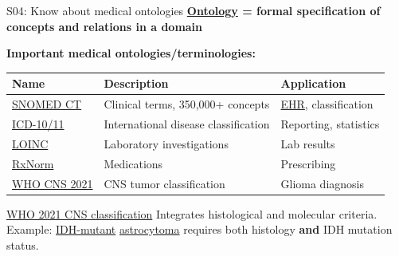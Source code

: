 \documentclass[aspectratio=169, 10pt]{beamer}
\begin{document}
\begin{frame}{S04: Know about medical ontologies}
    \textbf{\href{https://en.wikipedia.org/wiki/Ontology_(information_science)}{Ontology} = formal specification of concepts and relations in a domain}
    
    \vspace{0.3cm}
    \textbf{Important medical ontologies/terminologies:}
    \begin{center}
        \footnotesize
        \begin{tabular}{lp{5cm}l}
            \toprule
            \textbf{Name} & \textbf{Description} & \textbf{Application} \\
            \midrule
            \href{https://www.snomed.org/}{SNOMED CT} & Clinical terms, 350,000+ concepts & \href{https://en.wikipedia.org/wiki/Electronic_health_record}{EHR}, classification \\
            \href{https://www.who.int/standards/classifications/classification-of-diseases}{ICD-10/11} & International disease classification & Reporting, statistics \\
            \href{https://loinc.org/}{LOINC} & Laboratory investigations & Lab results \\
            \href{https://www.nlm.nih.gov/research/umls/rxnorm/}{RxNorm} & Medications & Prescribing \\
            \midrule
            \href{https://publications.iarc.who.int/Book-And-Report-Series/Who-Classification-Of-Tumours/Central-Nervous-System-Tumours-2021}{WHO CNS 2021} & CNS tumor classification & Glioma diagnosis \\
            \bottomrule
        \end{tabular}
    \end{center}
    
    \vspace{0.3cm}
    \begin{block}{\href{https://publications.iarc.who.int/Book-And-Report-Series/Who-Classification-Of-Tumours/Central-Nervous-System-Tumours-2021}{WHO 2021 CNS classification}}
        Integrates histological and molecular criteria. Example: \href{https://en.wikipedia.org/wiki/IDH1}{IDH-mutant} \href{https://en.wikipedia.org/wiki/Astrocytoma}{astrocytoma} requires both histology \textbf{and} IDH mutation status.
    \end{block}
\end{frame}
\end{document}

